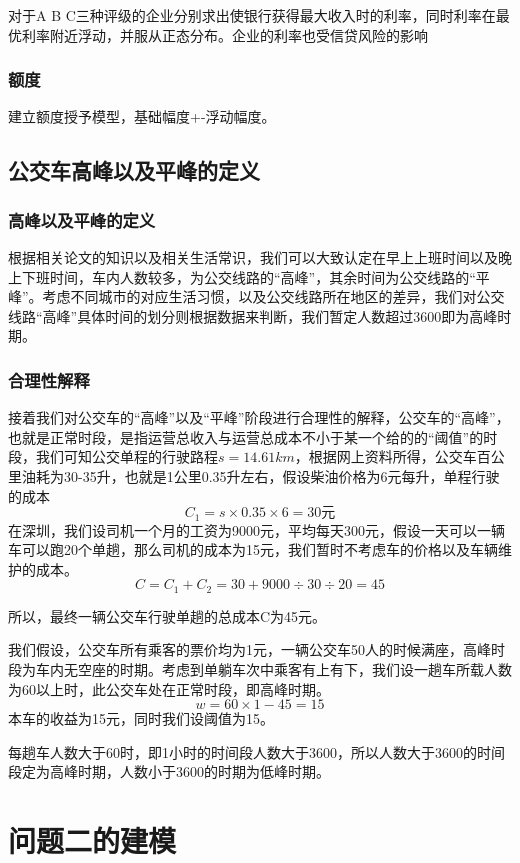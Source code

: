 \documentclass[UTF8]{ctexart}
\begin{document}
	对于A B C三种评级的企业分别求出使银行获得最大收入时的利率，同时利率在最优利率附近浮动，并服从正态分布。企业的利率也受信贷风险的影响
	
	\subsubsection{额度}
	建立额度授予模型，基础幅度+-浮动幅度。
	
	\subsection{公交车高峰以及平峰的定义}
	\subsubsection{高峰以及平峰的定义}
	根据相关论文的知识以及相关生活常识，我们可以大致认定在早上上班时间以及晚上下班时间，车内人数较多，为公交线路的“高峰”，其余时间为公交线路的“平峰”。考虑不同城市的对应生活习惯，以及公交线路所在地区的差异，我们对公交线路“高峰”具体时间的划分则根据数据来判断，我们暂定人数超过3600即为高峰时期。
	\subsubsection{合理性解释}
	接着我们对公交车的“高峰”以及“平峰”阶段进行合理性的解释，公交车的“高峰”，也就是正常时段，是指运营总收入与运营总成本不小于某一个给的的“阈值”的时段，我们可知公交单程的行驶路程$s=14.61km$，根据网上资料所得，公交车百公里油耗为30-35升，也就是1公里0.35升左右，假设柴油价格为6元每升，单程行驶的成本
	\[C_1=s\times0.35\times6=30 元\]
	在深圳，我们设司机一个月的工资为9000元，平均每天300元，假设一天可以一辆车可以跑20个单趟，那么司机的成本为15元，我们暂时不考虑车的价格以及车辆维护的成本。
	\[C=C_1+C_2=30+9000\div30\div20=45\]
	
	所以，最终一辆公交车行驶单趟的总成本C为45元。
	
	我们假设，公交车所有乘客的票价均为1元，一辆公交车50人的时候满座，高峰时段为车内无空座的时期。考虑到单躺车次中乘客有上有下，我们设一趟车所载人数为60以上时，此公交车处在正常时段，即高峰时期。
	\[w=60\times1-45=15\]
	本车的收益为15元，同时我们设阈值为15。
	
	每趟车人数大于60时，即1小时的时间段人数大于3600，所以人数大于3600的时间段定为高峰时期，人数小于3600的时期为低峰时期。
	
	
	\section{问题二的建模}
\end{document}
